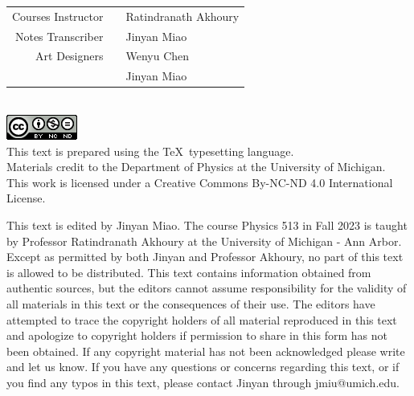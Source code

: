 \documentclass[11pt, onesided]{book}
\theoremstyle{break}
\theoremstyle{break}
\begin{document}
\tableofcontents
\hfill\break
\hfill\break
\hfill\break
 

\newpage
\setcounter{page}{1}
\vspace*{\fill}

\begin{center}
\begin{tabular}{rcl}
Courses Instructor & & Ratindranath Akhoury \medskip
\\
Notes Transcriber & & Jinyan Miao \medskip
\\
Art Designers & & Wenyu Chen \\
 & & Jinyan Miao \bigskip
\end{tabular} \\
\medskip
\includegraphics[scale=0.8]{cclisence.png}\\
\medskip
This text is prepared using the \TeX\ typesetting language. \\
Materials  credit to the Department of Physics at the University of Michigan.\\
This work is licensed under a Creative Commons By-NC-ND 4.0 International License.  \\
\end{center}

This text is edited by Jinyan Miao. The course Physics 513 in Fall 2023 is taught by Professor Ratindranath Akhoury at the University of Michigan - Ann Arbor. Except as permitted by both Jinyan and Professor Akhoury, no part of this text is allowed to be distributed. This text contains information obtained from authentic sources, but the editors cannot assume responsibility for the validity of all materials in this text or the consequences of their use. The editors have attempted to trace the copyright holders of all material reproduced in this text and apologize to copyright holders if permission to share in this form has not been obtained. If any copyright material has not been acknowledged please write and let us know. If you have any questions or concerns regarding this text, or if you find any typos in this text, please contact Jinyan through jmiu@umich.edu. 





\newpage
\end{document}
